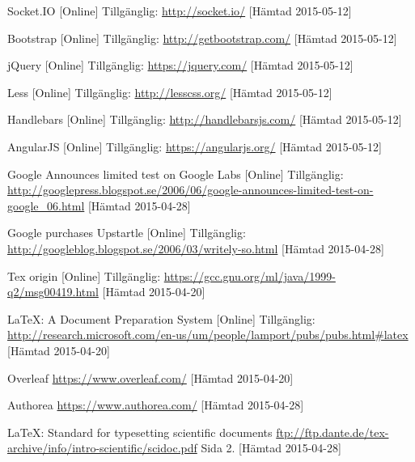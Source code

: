 \vspace{-15mm}
\renewcommand{\refname}{}
\begin{thebibliography}{9}

Socket.IO [Online] Tillgänglig: 
\url{http://socket.io/} [Hämtad 2015-05-12]

Bootstrap [Online] Tillgänglig: 
\url{http://getbootstrap.com/} [Hämtad 2015-05-12]

jQuery [Online] Tillgänglig: 
\url{https://jquery.com/} [Hämtad 2015-05-12]

Less [Online] Tillgänglig: 
\url{http://lesscss.org/} [Hämtad 2015-05-12]

Handlebars [Online] Tillgänglig: 
\url{http://handlebarsjs.com/} [Hämtad 2015-05-12]

AngularJS [Online] Tillgänglig: 
\url{https://angularjs.org/} [Hämtad 2015-05-12]

Google Announces limited test on Google Labs [Online] Tillgänglig: 
\url{http://googlepress.blogspot.se/2006/06/google-announces-limited-test-on-google_06.html} [Hämtad 2015-04-28]

Google purchases Upstartle [Online] Tillgänglig: 
\url{http://googleblog.blogspot.se/2006/03/writely-so.html} [Hämtad 2015-04-28]

Tex origin [Online] Tillgänglig: 
\url{https://gcc.gnu.org/ml/java/1999-q2/msg00419.html} [Hämtad 2015-04-20]

LaTeX: A Document Preparation System [Online] Tillgänglig: 
\url{http://research.microsoft.com/en-us/um/people/lamport/pubs/pubs.html#latex} [Hämtad 2015-04-20]

Overleaf 
\url{https://www.overleaf.com/} [Hämtad 2015-04-20]

Authorea 
\url{https://www.authorea.com/} [Hämtad 2015-04-28]
 
LaTeX: Standard for typesetting scientific documents
\url{ftp://ftp.dante.de/tex-archive/info/intro-scientific/scidoc.pdf} Sida 2. [Hämtad 2015-04-28]


\end{thebibliography}
